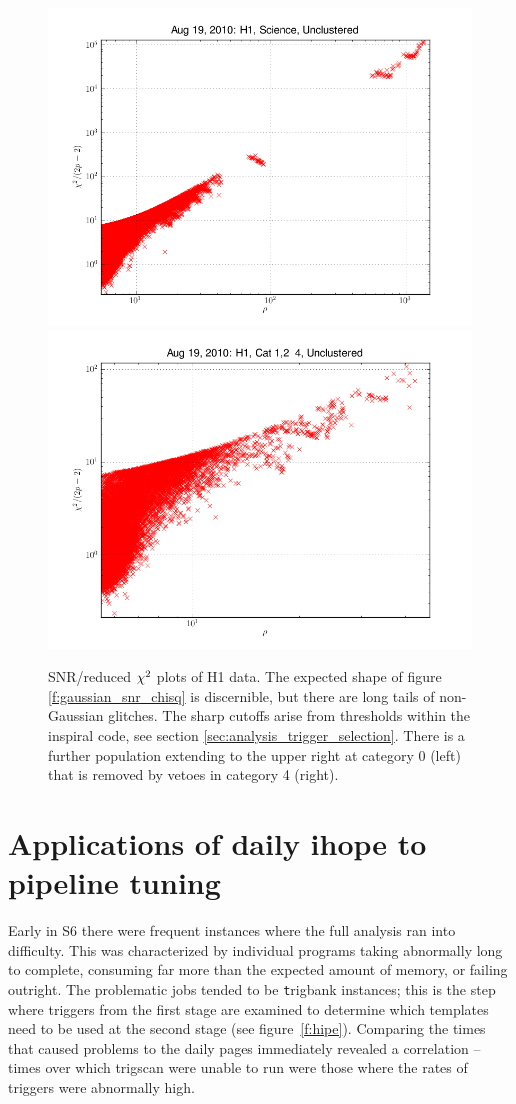 \begin{figure}
  \includegraphics[width=0.5\linewidth]{figures/detchar/H1_0_UNCLUSTERED_chisq.png}
  \includegraphics[width=0.5\linewidth]{figures/detchar/H1_4_UNCLUSTERED_chisq.png}
  \caption[SNR/reduced $\chisq$ plots of H1 data.]{
  \label{f:daily_ihope_snr_chisq}
SNR/reduced $\chisq$ plots of H1 data.  The expected shape
of figure \ref{f:gaussian_snr_chisq} is discernible, but there are
long tails of non-Gaussian glitches.  The sharp cutoffs arise 
from thresholds within the inspiral code, see section
\ref{sec:analysis_trigger_selection}.  There is a further
population extending to the upper right at category 0 (left) that is
removed by vetoes in category 4 (right).}
\end{figure}%


\section{Applications of daily ihope to pipeline tuning}
\label{sec:applications_pipeline}

Early in S6 there were frequent instances where the full analysis ran
into difficulty.  This was characterized by individual programs taking
abnormally long to complete, consuming far more than the expected
amount of memory, or failing outright.  The problematic jobs tended to
be {\texttt trigbank} instances; this is the step where triggers from
the first stage are examined to determine which templates need to be
used at the second stage (see figure~\ref{f:hipe}).  Comparing the
times that caused problems to the daily pages immediately revealed a
correlation -- times over which trigscan were unable to run were those
where the rates of triggers were abnormally high.

